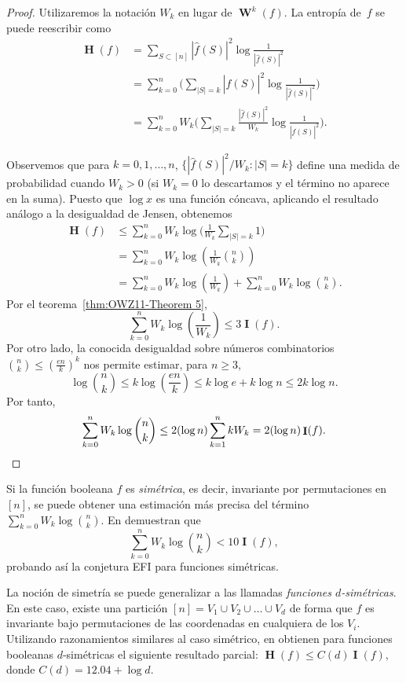 \documentclass[autocontact]{gaceta}
\DeclareMathOperator{\II}{\mathbf{I}}
\DeclareMathOperator{\HH}{\mathbf{H}}
\DeclareMathOperator{\WW}{\mathbf{W}}
\begin{document}
\begin{proof}
Utilizaremos la notación $W_k$ en lugar de $\WW^k(f)$. La entropía de~$f$ se puede reescribir como
\begin{align*}
   \HH(f) &= \sum_{S\subset [n]} |\widehat{f}(S)|^2 \log \frac{1}{|\widehat{f}(S)|^2}
   \\
   &= \sum_{k=0}^n \bigg(
   \sum_{|S|=k} |\widehat{f}(S)|^2 \log\frac{1}{|\widehat{f}(S)|^2}
   \bigg)
   \\
   &= \sum_{k=0}^n W_k\bigg(
   \sum_{|S|=k} \frac{|\widehat{f}(S)|^2}{W_k} \log\frac{1}{|\widehat{f}(S)|^2}
   \bigg).
\end{align*}

Observemos que para $k=0,1,\dots, n$, $\{ |\widehat{f}(S)|^2/W_k: |S|=k\}$ define una medida de probabilidad cuando $W_k>0$ (si $W_k=0$ lo descartamos y el término no aparece en la suma). Puesto que $\log x$ es una función cóncava, aplicando el resultado análogo a la desigualdad de Jensen, obtenemos
\begin{align*}
   \HH(f) &\leq \sum_{k=0}^n W_k \log\bigg(\frac{1}{W_k}\sum_{|S|=k} 1\bigg)
   \\
   &= \sum_{k=0}^n W_k \log \left( \frac{1}{W_k} \binom{n}{k} \right)
   \\
   &= \sum_{k=0}^n W_k \log \left(\frac{1}{W_k}\right)
   + \sum_{k=0}^n W_k \log \binom{n}{k}.
\end{align*}
Por el teorema~\ref{thm:OWZ11-Theorem 5},
\[
\sum_{k=0}^n W_k \log \left(\frac{1}{W_k}\right)\leq 3 \II(f).
\]
Por otro lado, la conocida desigualdad sobre números combinatorios $\binom{n}{k} \leq \left(\frac{en}{k}\right)^k$ nos permite estimar, para $n\geq 3$,
\[
   \log\binom{n}{k}
   \leq k \log \left(\frac{en}{k}\right)
   \leq k\log e + k\log n
   \leq 2k \log n.
\]
Por tanto,
\[
   \sum_{k=0}^n W_k \log \binom{n}{k}
   \leq 2(\log n) \sum_{k=1}^n k W_k = 2(\log n) \II(f).
   \qedhere
\]
\end{proof}

Si la función booleana $f$ es \emph{simétrica}, es decir, invariante por permutaciones en~$[n]$, se puede obtener una estimación más precisa del término $\sum_{k=0}^n W_k \log \binom{n}{k}$. En \cite[teorema 4]{OWZ11} demuestran que
\[
\sum_{k=0}^n W_k \log \binom{n}{k} < 10 \II(f),
\]
probando así la conjetura EFI para funciones simétricas.

La noción de simetría se puede generalizar a las llamadas \emph{funciones $d$-simétricas}. En este caso, existe una partición $[n] = V_1\cup V_2\cup\dots\cup V_d$ de forma que $f$
es invariante bajo permutaciones de las coordenadas en cualquiera de los $V_i$. Utilizando razonamientos similares al caso simétrico, en \cite[teorema 2]{OWZ11} obtienen para funciones booleanas $d$-simétricas el siguiente resultado parcial:
$\HH(f) \leq C(d) \II(f),$
donde $C(d)=12.04+\log d$.
\end{document}
